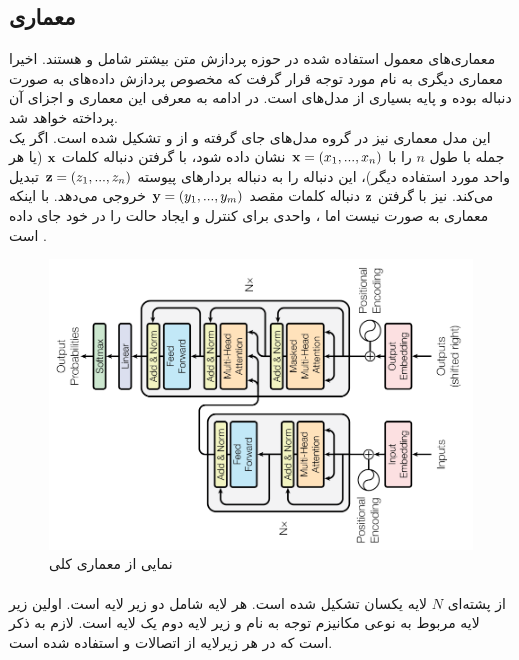 \subsection{معماری \transformer{}}
معماری‌های معمول استفاده شده در حوزه پردازش متن بیشتر شامل \lstm{} و \cnn{} هستند. اخیرا معماری دیگری به نام \transformer{} مورد توجه قرار گرفت که مخصوص پردازش داده‌های به صورت دنباله بوده و پایه بسیاری از مدل‌های \stateoftheart{} است. در ادامه به معرفی این معماری و اجزای آن پرداخته خواهد شد.
\\
این مدل معماری نیز در گروه مدل‌های
جای گرفته و از \encoder{} و \decoder{} تشکیل شده است. اگر یک جمله با طول $n$ را با ${\bf x} = (x_1, ..., x_n)$  نشان داده شود، \encoder{} با گرفتن دنباله کلمات ${\bf x}$ (یا هر واحد مورد استفاده دیگر)، این دنباله  را به دنباله بردار‌های پیوسته ${\bf z} = (z_1, ..., z_n)$ تبدیل می‌کند. \decoder{} نیز با گرفتن ${\bf z}$ دنباله کلمات مقصد ${\bf y} = (y_1, ..., y_m)$ خروجی می‌دهد. با اینکه معماری \encoder{} به صورت \autoregressive{} نیست اما \decoder{}، واحدی برای کنترل و ایجاد حالت \autoregressive{} را در خود جای داده است \cite{transformer}.
\begin{figure}[H]
    \centering
    \includegraphics[width=.7\textwidth, angle=-90]{images/attention3.png}
    \caption{
        نمایی از معماری کلی \transformer{} \cite{transformer}}
\end{figure}

\paragraph*{\encoder{}}
\encoder{}
از پشته‌ای $N$ لایه یکسان تشکیل شده است. هر لایه شامل دو زیر لایه است. اولین زیر لایه مربوط به نوعی مکانیزم توجه به نام
و زیر لایه دوم یک لایه
است. لازم به ذکر است که در هر زیرلایه از اتصالات
و
استفاده شده است\cite{transformer}.
